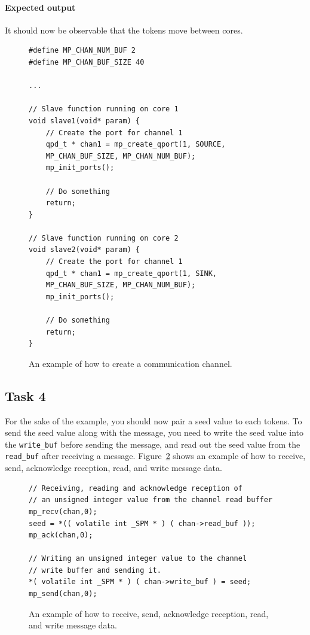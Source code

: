 \documentclass[a4paper,fontsize=10pt,twoside,DIV15,BCOR12mm,headinclude=true,footinclude=false,pagesize,bibtotoc]{scrbook}
\newcommand{\code}[1]{{\texttt{#1}}}
\begin{document}
\paragraph*{Expected output}
It should now be observable that the tokens move between cores.

\begin{figure}
\begin{Verbatim}[xleftmargin=1cm,xrightmargin=1cm,frame=single,framesep=3mm]
#define MP_CHAN_NUM_BUF 2
#define MP_CHAN_BUF_SIZE 40

...

// Slave function running on core 1
void slave1(void* param) {
	// Create the port for channel 1
	qpd_t * chan1 = mp_create_qport(1, SOURCE, 
	MP_CHAN_BUF_SIZE, MP_CHAN_NUM_BUF);
	mp_init_ports();

	// Do something
	return;
}

// Slave function running on core 2
void slave2(void* param) {
	// Create the port for channel 1
	qpd_t * chan1 = mp_create_qport(1, SINK, 
	MP_CHAN_BUF_SIZE, MP_CHAN_NUM_BUF);
	mp_init_ports();

	// Do something
	return;
}
\end{Verbatim}
\caption{\label{fig:open_channel}An example of how to create a communication channel.}
\end{figure}


\subsection{Task 4}
For the sake of the example, you should now pair a seed value to each tokens.
To send the seed value along with the message, you need to write the seed value into
the \code{write\_buf} before sending the message, and read out the seed value from the \code{read\_buf}
after receiving a message.
Figure~\ref{fig:msg_data} shows an example of how to receive, send, acknowledge reception, read, and write message data.

\begin{figure}
\begin{Verbatim}[xleftmargin=1cm,xrightmargin=1cm,frame=single,framesep=3mm]
// Receiving, reading and acknowledge reception of 
// an unsigned integer value from the channel read buffer
mp_recv(chan,0);
seed = *(( volatile int _SPM * ) ( chan->read_buf )); 
mp_ack(chan,0);

// Writing an unsigned integer value to the channel 
// write buffer and sending it.
*( volatile int _SPM * ) ( chan->write_buf ) = seed; 
mp_send(chan,0);
\end{Verbatim}
\caption{\label{fig:msg_data}An example of how to receive, send, acknowledge reception, read, and write message data.}
\end{figure}
\end{document}
